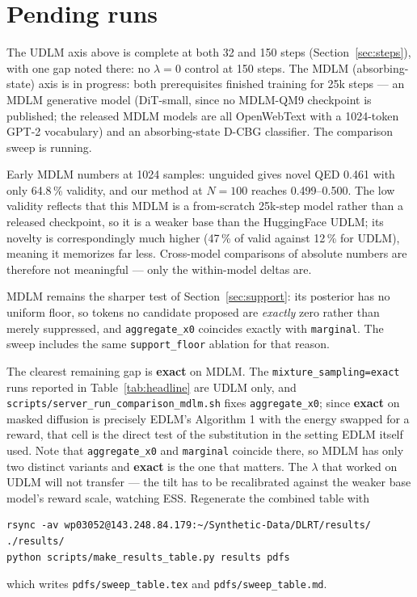 \documentclass[11pt]{article}
\begin{document}
\section{Pending runs}
\label{sec:pending}

The UDLM axis above is complete at both 32 and 150 steps
(Section~\ref{sec:steps}), with one gap noted there: no $\lambda = 0$ control at
150 steps. The MDLM (absorbing-state) axis is in progress:
both prerequisites finished training for 25k steps --- an MDLM generative model
(DiT-small, since no MDLM-QM9 checkpoint is published; the released MDLM models
are all OpenWebText with a 1024-token GPT-2 vocabulary) and an absorbing-state
D-CBG classifier. The comparison sweep is running.

Early MDLM numbers at 1024 samples: unguided gives novel QED 0.461 with only
64.8\,\% validity, and our method at $N = 100$ reaches 0.499--0.500. The low
validity reflects that this MDLM is a from-scratch 25k-step model rather than a
released checkpoint, so it is a weaker base than the HuggingFace UDLM; its
novelty is correspondingly much higher (47\,\% of valid against 12\,\% for
UDLM), meaning it memorizes far less. Cross-model comparisons of absolute
numbers are therefore not meaningful --- only the within-model deltas are.

MDLM remains the sharper test of Section~\ref{sec:support}: its posterior has no
uniform floor, so tokens no candidate proposed are \emph{exactly} zero rather
than merely suppressed, and \texttt{aggregate\_x0} coincides exactly with
\texttt{marginal}. The sweep includes the same \texttt{support\_floor} ablation
for that reason.

The clearest remaining gap is \textbf{exact} on MDLM. The
\texttt{mixture\_sampling=exact} runs reported in Table~\ref{tab:headline} are
UDLM only, and \texttt{scripts/server\_run\_comparison\_mdlm.sh} fixes
\texttt{aggregate\_x0}; since \textbf{exact} on masked diffusion is precisely
EDLM's Algorithm 1 with the energy swapped for a reward, that cell is the direct
test of the substitution in the setting EDLM itself used. Note that
\texttt{aggregate\_x0} and \texttt{marginal} coincide there, so MDLM has only two
distinct variants and \textbf{exact} is the one that matters. The $\lambda$ that
worked on UDLM will not transfer --- the tilt has to be recalibrated against the
weaker base model's reward scale, watching ESS.
Regenerate the combined table with
\begin{verbatim}
rsync -av wp03052@143.248.84.179:~/Synthetic-Data/DLRT/results/ ./results/
python scripts/make_results_table.py results pdfs
\end{verbatim}
which writes \texttt{pdfs/sweep\_table.tex} and \texttt{pdfs/sweep\_table.md}.
\end{document}
